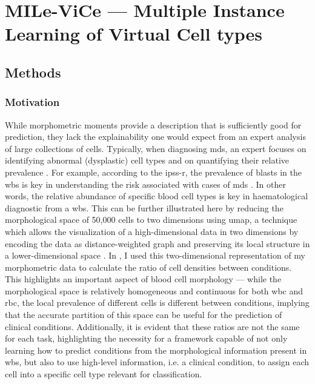 \section{MILe-ViCe --- Multiple Instance Learning of Virtual Cell types}

\subsection{Methods}

\subsubsection{Motivation}

While morphometric moments provide a description that is sufficiently good for prediction, they lack the explainability one would expect from an expert analysis of large collections of cells. Typically, when diagnosing \ac{mds}, an expert focuses on identifying abnormal (dysplastic) cell types and on quantifying their relative prevalence \cite{Valent2017-uh}. For example, according to the \ac{ipss-r}, the prevalence of blasts in the \ac{wbs} is key in understanding the risk associated with cases of \ac{mds} \cite{Greenberg2012-en}. In other words, the relative abundance of specific blood cell types is key in haematological diagnostic from a \ac{wbs}. This can be further illustrated here by reducing the morphological space of 50,000 cells to two dimensions using \ac{umap}, a technique which allows the visualization of a high-dimensional data in two dimensions by encoding the data as distance-weighted graph and preserving its local structure in a lower-dimensional space \cite{umap-ref}. In , I used this two-dimensional representation of my morphometric data to calculate the ratio of cell densities between conditions. This highlights an important aspect of blood cell morphology --- while the morphological space is relatively homogeneous and continuous for both \ac{wbc} and \ac{rbc}, the local prevalence of different cells is different between conditions, implying that the accurate partition of this space can be useful for the prediction of clinical conditions. Additionally, it is evident that these ratios are not the same for each task, highlighting the necessity for a framework capable of not only learning how to predict conditions from the morphological information present in \ac{wbs}, but also to use high-level information, i.e. a clinical condition, to assign each cell into a specific cell type relevant for classification.

